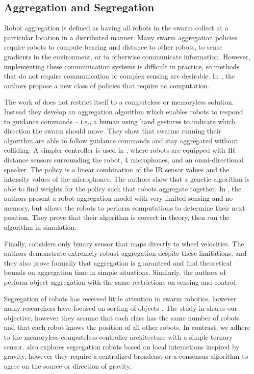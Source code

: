 \documentclass[conference]{IEEEtran}
\begin{document}
  \subsection{Aggregation and Segregation}
    Robot aggregation is defined as having all robots in the swarm collect at a particular location in a distributed manner. Many swarm aggregation policies require robots to compute bearing and distance to other robots, to sense gradients in the environment, or to otherwise communicate information. However, implementing these communication systems is difficult in practice, so methods that do not require communication or complex sensing are desirable. In \cite{gauci_self-organized_2014}, the authors propose a new class of policies that require no computation.

    The work of \cite{gasparri_swarm_2012} does not restrict itself to a computeless or memoryless solution. Instead they develop an aggregation algorithm which enables robots to respond to guidance commands -- i.e., a human using hand gestures to indicate which direction the swarm should move. They show that swarms running their algorithm are able to follow guidance commands and stay aggregated without colliding. A simpler controller is used in \cite{bahgeci_evolving_2005}, where robots are equipped with IR distance sensors surrounding the robot, 4 microphones, and an omni-directional speaker. The policy is a linear combination of the IR sensor values and the intensity values of the microphones. The authors show that a genetic algorithm is able to find weights for the policy such that robots aggregate together. In \cite{ando_distributed_1999}, the authors present a robot aggregation model with very limited sensing and no memory, but allows the robots to perform computations to determine their next position. They prove that their algorithm is correct in theory, then run the algorithm in simulation.

    Finally, \cite{gauci_self-organized_2014} considers only binary sensor that maps directly to wheel velocities. The authors demonstrate extremely robust aggregation despite these limitations, and they also prove formally that aggregation is guaranteed and find theoretical bounds on aggregation time in simple situations. Similarly, the authors of \cite{gauci_clustering_2014} perform object aggregation with the same restrictions on sensing and control.

    Segregation of robots has received little attention in swarm robotics, however many researchers have focused on sorting of objects \cite{vardy_accelerated_2012} \cite{holland_collective_1998} \cite{tao_wang_collective_2004} \cite{holland_stigmergy_1999}. The study in \cite{santos_segregation_2014} shares our objective, however they assume that each class has the same number of robots and that each robot knows the position of all other robots. In contrast, we adhere to the memoryless computeless controller architecture with a simple ternary sensor. \cite{gros_segregation_2009} also explores segregation robots based on local interactions inspired by gravity, however they require a centralized broadcast or a consensus algorithm to agree on the source or direction of gravity.
\end{document}
